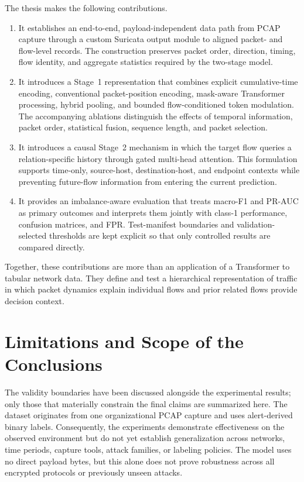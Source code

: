 \documentclass[11pt,fleqn]{report}
\begin{document}
The thesis makes the following contributions.

\begin{enumerate}
    \item It establishes an end-to-end, payload-independent data path from PCAP
    capture through a custom Suricata output module to aligned packet- and
    flow-level records. The construction preserves packet order, direction,
    timing, flow identity, and aggregate statistics required by the two-stage
    model.

    \item It introduces a Stage~1 representation that combines explicit
    cumulative-time encoding, conventional packet-position encoding,
    mask-aware Transformer processing, hybrid pooling, and bounded
    flow-conditioned token modulation. The accompanying ablations distinguish
    the effects of temporal information, packet order, statistical fusion,
    sequence length, and packet selection.

    \item It introduces a causal Stage~2 mechanism in which the target flow
    queries a relation-specific history through gated multi-head attention.
    This formulation supports time-only, source-host, destination-host, and
    endpoint contexts while preventing future-flow information from entering
    the current prediction.

    \item It provides an imbalance-aware evaluation that treats macro-F1 and
    PR-AUC as primary outcomes and interprets them jointly with class-1
    performance, confusion matrices, and FPR. Test-manifest boundaries and
    validation-selected thresholds are kept explicit so that only controlled
    results are compared directly.
\end{enumerate}

Together, these contributions are more than an application of a Transformer to
tabular network data. They define and test a hierarchical representation of
traffic in which packet dynamics explain individual flows and prior related
flows provide decision context.

\section{Limitations and Scope of the Conclusions}
\label{subsec:conclusion_limitations}

The validity boundaries have been discussed alongside the experimental results;
only those that materially constrain the final claims are summarized here. The
dataset originates from one organizational PCAP capture and uses alert-derived
binary labels. Consequently, the experiments demonstrate effectiveness on the
observed environment but do not yet establish generalization across networks,
time periods, capture tools, attack families, or labeling policies. The model
uses no direct payload bytes, but this alone does not prove robustness across
all encrypted protocols or previously unseen attacks.
\end{document}

